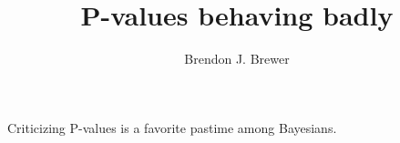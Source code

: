 \documentclass[a4paper, 12pt]{article}
\title{P-values behaving badly}
\author{Brendon J. Brewer}
\begin{document}
\maketitle

Criticizing P-values is a favorite pastime among Bayesians.
\end{document}
